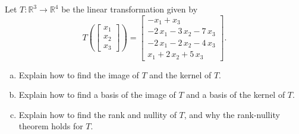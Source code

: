 
\begin{exerciseStatement}
 Let \(T:\mathbb{R}^ 3  \to \mathbb{R}^ 4 \) be the linear transformation given by \[T\left(  \left[\begin{array}{c}
x_{1} \\
x_{2} \\
x_{3}
\end{array}\right]  \right) =  \left[\begin{array}{c}
-x_{1} + x_{3} \\
-2 \, x_{1} - 3 \, x_{2} - 7 \, x_{3} \\
-2 \, x_{1} - 2 \, x_{2} - 4 \, x_{3} \\
x_{1} + 2 \, x_{2} + 5 \, x_{3}
\end{array}\right] .\]
\begin{enumerate}[(a)]
\item Explain how to find the image of \(T\) and the kernel of \(T\).
\item Explain how to find a basis of the image of \(T\) and a basis of the kernel of \(T\).
\item Explain how to find the rank and nullity of \(T\), and why the rank-nullity theorem holds for \(T\).
\end{enumerate}
    
\end{exerciseStatement}
    
